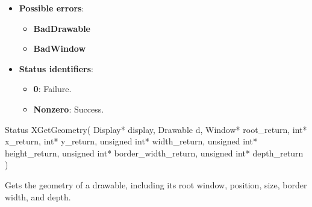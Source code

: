 \documentclass{report}
\begin{document}
\begin{itemize}
            \begin{itemize}
                \item \textbf{Possible errors}:
                    \begin{itemize}
                        \item \textbf{BadDrawable}
                        \item \textbf{BadWindow}
                    \end{itemize}
                \item \textbf{Status identifiers}:
                    \begin{itemize}
                        \item \textbf{0}: Failure.
                        \item \textbf{Nonzero}: Success.
                    \end{itemize}
            \end{itemize}

            \begin{cppcode}
                Status XGetGeometry(
                    Display* display, 
                    Drawable d,
                    Window* root_return,
                    int* x_return, int* y_return,
                    unsigned int* width_return, unsigned int* height_return,
                    unsigned int* border_width_return,
                    unsigned int* depth_return
                )
            \end{cppcode}
            \bigbreak \noindent
            Gets the geometry of a drawable, including its root window, position, size, border width, and depth.


\end{itemize}
\end{document}
